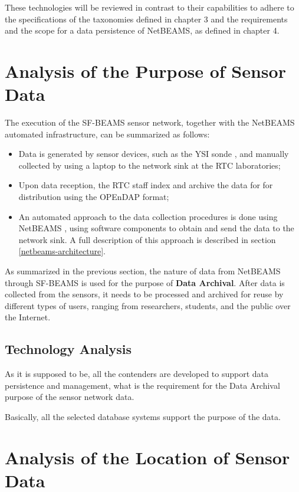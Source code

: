 These technologies will be reviewed in contrast to their capabilities to adhere
to the specifications of the taxonomies defined in chapter 3 and the
requirements and the scope for a data persistence of NetBEAMS, as defined in
chapter 4.

\section{Analysis of the Purpose of Sensor Data}

The execution of the SF-BEAMS sensor network, together with the NetBEAMS
automated infrastructure, can be summarized as follows:

\begin{itemize}
  \item Data is generated by sensor devices, such as the YSI sonde
  \cite{YSI-Sonde}, and manually collected by using a laptop to the network
  sink at the RTC laboratories;
  \item Upon data reception, the RTC staff index and archive the data for for
  distribution using the OPEnDAP format;
  \item An automated approach to the data collection procedures is done using 
  NetBEAMS \cite{netbeams2009}, using software components to obtain and send
  the data to the network sink. A full description of this approach is
  described in section \ref{netbeams-architecture}.
\end{itemize}

As summarized in the previous section, the nature of data from NetBEAMS through
SF-BEAMS is used for the purpose of \textbf{Data Archival}. After data is
collected from the sensors, it needs to be processed and archived for reuse by
different types of users, ranging from researchers, students, and the public
over the Internet.

\subsection{Technology Analysis}

As it is supposed to be, all the contenders are developed to support data
persistence and management, what is the requirement for the Data Archival
purpose of the sensor network data.

Basically, all the selected database systems support the purpose of the data.

\section{Analysis of the Location of Sensor Data}
\label{sec:sn-data-location}

